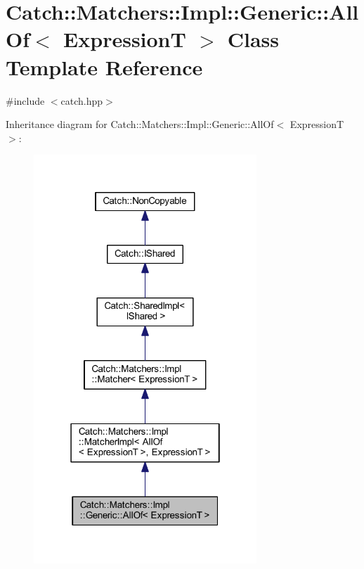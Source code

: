 \hypertarget{class_catch_1_1_matchers_1_1_impl_1_1_generic_1_1_all_of}{}\section{Catch\+:\+:Matchers\+:\+:Impl\+:\+:Generic\+:\+:All\+Of$<$ ExpressionT $>$ Class Template Reference}
\label{class_catch_1_1_matchers_1_1_impl_1_1_generic_1_1_all_of}


{\ttfamily \#include $<$catch.\+hpp$>$}



Inheritance diagram for Catch\+:\+:Matchers\+:\+:Impl\+:\+:Generic\+:\+:All\+Of$<$ ExpressionT $>$\+:\nopagebreak
\begin{figure}[H]
\begin{center}
\leavevmode
\includegraphics[width=238pt]{class_catch_1_1_matchers_1_1_impl_1_1_generic_1_1_all_of__inherit__graph}
\end{center}
\end{figure}


